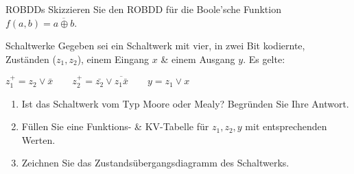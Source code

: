 \documentclass{exercisesheet}
\begin{document}
\begin{exercise*}{ROBDDs}
  Skizzieren Sie den ROBDD für die Boole'sche Funktion $f(a, b) = \overline{a \oplus b}$.
\end{exercise*}

\begin{solution*}
\end{solution*}

\begin{exercise*}{Schaltwerke}
  Gegeben sei ein Schaltwerk mit vier, in zwei Bit kodiernte, Zuständen ($z_1, z_2$), einem Eingang $x$ \& einem Ausgang $y$. Es gelte:
  \begin{center}$z_1^+ = z_2 \lor \bar{x}\qquad z_2^+ = \bar{z_2} \lor \overline{z_1\bar{x}}\qquad y = z_1 \lor x$\end{center}
  \begin{enumerate}
    \item Ist das Schaltwerk vom Typ Moore oder Mealy? Begründen Sie Ihre Antwort.
    \item Füllen Sie eine Funktions- \& KV-Tabelle für $z_1, z_2, y$ mit entsprechenden Werten.
    \item Zeichnen Sie das Zustandsübergangsdiagramm des Schaltwerks.
  \end{enumerate}
\end{exercise*}
\end{document}
